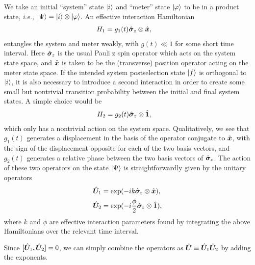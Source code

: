 We take an initial ``system'' state $\lvert i\rangle$ and ``meter'' state $\lvert \varphi\rangle$ to be in a product state, \emph{i.e.,} $\lvert \Psi\rangle = \lvert i\rangle \otimes \lvert \varphi\rangle$.  An effective interaction Hamiltonian 
\begin{align}\label{eq:kick hamiltonian}
	H_1 &= g_1(t) \hat{\bm \sigma}_z \otimes \hat{\bm x},
\end{align}
entangles the system and meter weakly, with $g(t) \ll 1$ for some short time interval.  Here $\hat{\bm \sigma}_z$ is the usual Pauli z spin operator which acts on the system state space, and $\hat{\bm x}$ is taken to be the (transverse) position operator acting on the meter state space.  If the intended system postselection state $\lvert f\rangle$ is orthogonal to $\lvert i\rangle$, it is also necessary to introduce a second interaction in order to create some small but nontrivial transition probability between the initial and final system states.  A simple choice would be 
\begin{align}\label{eq:phase hamiltonian}
	H_2 &= g_2(t) \hat{\bm \sigma}_z \otimes \hat{\bm 1},
\end{align}
which only has a nontrivial action on the system space.  Qualitatively, we see that $g_1(t)$ generates a displacement in the basis of the operator conjugate to $\hat{\bm x}$, with the sign of the displacement opposite for each of the two basis vectors, and $g_2(t)$ generates a relative phase between the two basis vectors of $\hat{\bm \sigma}_z$.  The action of these two operators on the state $\lvert \Psi\rangle$ is straightforwardly given by the unitary operators 
\begin{align}
	\nonumber\hat{\bm U}_1 &= \exp(-i k \hat{\bm \sigma}_z \otimes \hat{\bm x}), \\
	\hat{\bm U}_2 &= \exp(-i  \frac{\phi}{2} \hat{\bm \sigma}_z \otimes \hat{\bm 1}),
\end{align}
where $k$ and $\phi$ are effective interaction parameters found by integrating the above Hamiltonians over the relevant time interval.  

Since $[\hat{\bm U}_1, \hat{\bm U}_2] = 0$, we can simply combine the operators as $\hat{\bm U} \equiv \hat{\bm U}_1 \hat{\bm U}_2$ by adding the exponents.

